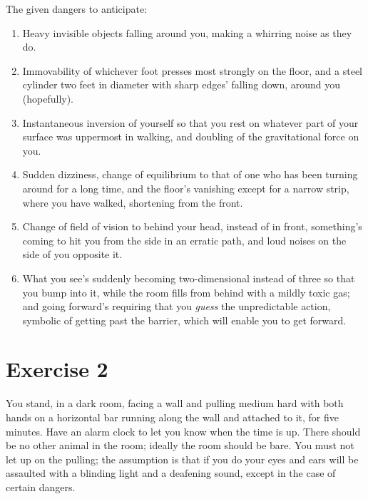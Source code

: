 The given dangers to anticipate: 
\begin{enumerate}
\item Heavy invisible objects falling around you, making a whirring noise as 
they do. 
\item Immovability of whichever foot presses most strongly on the floor, and 
a steel cylinder two feet in diameter with sharp edges' falling down, around 
you (hopefully). 
\item Instantaneous inversion of yourself so that you rest on whatever part of 
your surface was uppermost in walking, and doubling of the gravitational 
force on you. 
\item Sudden dizziness, change of equilibrium to that of one who has been 
turning around for a long time, and the floor's vanishing except for a narrow 
strip, where you have walked, shortening from the front. 
\item Change of field of vision to behind your head, instead of in front, 
something's coming to hit you from the side in an erratic path, and loud 
noises on the side of you opposite it. 
\item What you see's suddenly becoming two-dimensional instead of three so 
that you bump into it, while the room fills from behind with a mildly toxic gas; 
and going forward's requiring that you \emph{guess} the unpredictable action, 
symbolic of getting past the barrier, which will enable you to get forward. 
\end{enumerate}

\section*{Exercise 2}

You stand, in a dark room, facing a wall and pulling medium hard with both 
hands on a horizontal bar running along the wall and attached to it, for five 
minutes. Have an alarm clock to let you know when the time is up. There 
should be no other animal in the room; ideally the room should be bare. You 
must not let up on the pulling; the assumption is that if you do your eyes 
and ears will be assaulted with a blinding light and a deafening sound, 
except in the case of certain dangers. 

